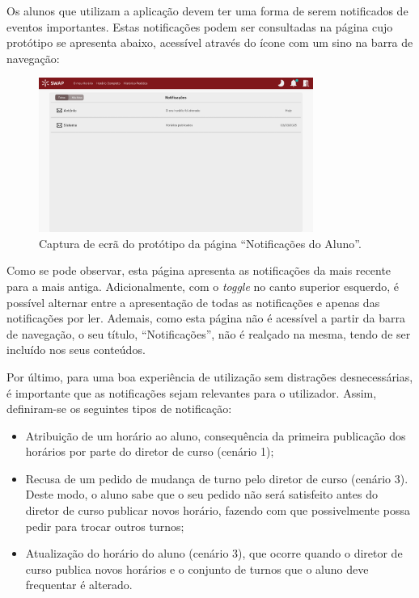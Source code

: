 \documentclass[12pt, a4paper]{article}
\begin{document}
Os alunos que utilizam a aplicação devem ter uma forma de serem notificados de eventos importantes.
Estas notificações podem ser consultadas na página cujo protótipo se apresenta abaixo, acessível
através do ícone com um sino na barra de navegação:

\begin{figure}[H]
    \centering
    \includegraphics[width=0.8\textwidth]{res/prototype/notificacoes-aluno.png}
    \caption{Captura de ecrã do protótipo da página ``Notificações do Aluno''.}
    \label{notificacoes-aluno}
\end{figure}

Como se pode observar, esta página apresenta as notificações da mais recente para a mais antiga.
Adicionalmente, com o \emph{toggle} no canto superior esquerdo, é possível alternar entre a
apresentação de todas as notificações e apenas das notificações por ler. Ademais, como esta página
não é acessível a partir da barra de navegação, o seu título, ``Notificações'', não é realçado na
mesma, tendo de ser incluído nos seus conteúdos.

Por último, para uma boa experiência de utilização sem distrações desnecessárias, é importante que
as notificações sejam relevantes para o utilizador. Assim, definiram-se os seguintes tipos de
notificação:

\begin{itemize}
    \item Atribuição de um horário ao aluno, consequência da primeira publicação dos horários por
        parte do diretor de curso (cenário 1);
    \item Recusa de um pedido de mudança de turno pelo diretor de curso (cenário 3). Deste modo, o
        aluno sabe que o seu pedido não será satisfeito antes do diretor de curso publicar novos
        horário, fazendo com que possivelmente possa pedir para trocar outros turnos;
    \item Atualização do horário do aluno (cenário 3), que ocorre quando o diretor de curso publica
        novos horários e o conjunto de turnos que o aluno deve frequentar é alterado.
\end{itemize}
\end{document}
